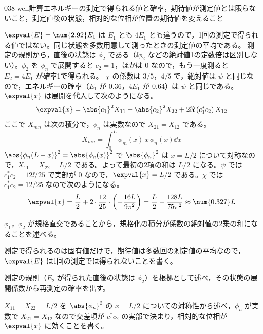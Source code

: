\documentclass[uplatex,dvipdfmx,a4paper,11pt]{jsarticle}
\begin{document}
\begin{mondai}{038-well}{計算}{エネルギーの測定で得られる値と確率，期待値が測定値とは限らないこと，測定直後の状態，相対的な位相が位置の期待値を変えること}
\begin{tadashii}
$\expval{E}=\num{2.92}E_{1}$ は $E_{1}$ とも $4E_{1}$ とも違うので，1回の測定で得られる値ではない。同じ状態を多数用意して測ったときの測定値の平均である。
 測定の規則から，直後の状態は $\phi_{2}$ である（$\ii\phi_{2}$ などの絶対値1の定数倍は区別しない）。$\phi_{2}$ を $\phi_{n}$ で展開すると $c_{2}=1$，ほかは $0$ なので，もう一度測ると $E_{2}=4E_{1}$ が確率1で得られる。
 $\chi$ の係数は $3/5$，$4/5$ で，絶対値は $\psi$ と同じなので，エネルギーの確率（$E_{1}$ が $\num{0.36}$，$4E_{1}$ が $\num{0.64}$）は $\psi$ と同じである。$\expval{x}$ は展開を代入して次のようになる。
\[ \expval{x}=\abs{c_{1}}^{2}X_{11}+\abs{c_{2}}^{2}X_{22}+2\Re\left(c_{1}^{*}c_{2}\right)X_{12} \]
ここで $X_{mn}$ は次の積分で，$\phi_{n}$ は実数なので $X_{21}=X_{12}$ である。
\[ X_{mn}=\int_{0}^{L}\phi_{m}(x)\,x\,\phi_{n}(x)\dd x \]
$\abs{\phi_{n}(L-x)}^{2}=\abs{\phi_{n}(x)}^{2}$ で $\abs{\phi_{n}}^{2}$ は $x=L/2$ について対称なので，$X_{11}=X_{22}=L/2$ である。よって最初の2項の和は $L/2$ になる。$\psi$ では $c_{1}^{*}c_{2}=12\ii/25$ で実部が $0$ なので，$\expval{x}=L/2$ である。$\chi$ では $c_{1}^{*}c_{2}=12/25$ なので次のようになる。
\[ \expval{x}=\frac{L}{2}+2\cdot\frac{12}{25}\cdot\left(-\frac{16L}{9\pi^{2}}\right)=\frac{L}{2}-\frac{128L}{75\pi^{2}}\approx\num{0.327}L \]
\begin{ronten}
  \item {} $\phi_{1}$，$\phi_{2}$ が規格直交であることから，規格化の積分が係数の絶対値の2乗の和になることを述べる。
  \item {} 測定で得られるのは固有値だけで，期待値は多数回の測定値の平均なので，$\expval{E}$ は1回の測定では得られないことを書く。
  \item {} 測定の規則（$E_{2}$ が得られた直後の状態は $\phi_{2}$）を根拠として述べ，その状態の展開係数から再測定の確率を出す。
  \item {} $X_{11}=X_{22}=L/2$ を $\abs{\phi_{n}}^{2}$ の $x=L/2$ についての対称性から述べ，$\phi_{n}$ が実数で $X_{21}=X_{12}$ なので交差項が $c_{1}^{*}c_{2}$ の実部で決まり，相対的な位相が $\expval{x}$ に効くことを書く。
\end{ronten}

\end{tadashii}
\end{mondai}
\end{document}
